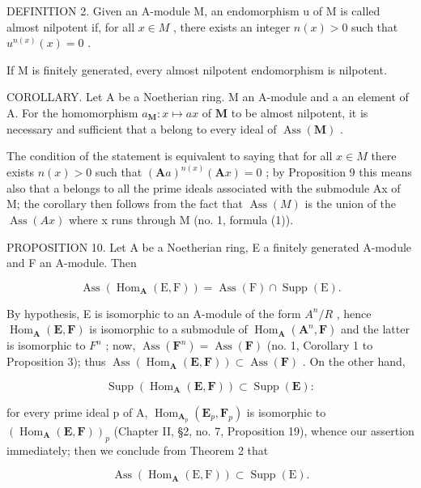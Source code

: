 DEFINITION 2. Given an A-module M, an endomorphism u of M is called almost nilpotent if, for all \(x \in M\) , there exists an integer \(n(x) > 0\) such that \(u^{n(x)}(x) = 0\) .

If M is finitely generated, every almost nilpotent endomorphism is nilpotent.

COROLLARY. Let A be a Noetherian ring. M an A-module and a an element of A. For the homomorphism \(a_{\mathbf{M}}: x \mapsto ax\) of \(\mathbf{M}\) to be almost nilpotent, it is necessary and sufficient that a belong to every ideal of \(\operatorname{Ass}(\mathbf{M})\) .

The condition of the statement is equivalent to saying that for all \(x \in M\) there exists \(n(x) > 0\) such that \((\mathbf{A}a)^{n(x)}(\mathbf{A}x) = 0\) ; by Proposition 9 this means also that a belongs to all the prime ideals associated with the submodule Ax of M; the corollary then follows from the fact that \(\operatorname{Ass}(M)\) is the union of the \(\operatorname{Ass}(Ax)\) where x runs through M (no. 1, formula (1)).

PROPOSITION 10. Let A be a Noetherian ring, E a finitely generated A-module and F an A-module. Then

\[
\operatorname{Ass} \left(\operatorname{Hom} _ {\mathbf {A}} (\mathrm{E}, \mathrm{F})\right) = \operatorname{Ass} (\mathrm{F}) \cap \operatorname{Supp} (\mathrm{E}).\tag{5}
\]

By hypothesis, E is isomorphic to an A-module of the form \(A^{n}/R\) , hence \(\operatorname{Hom}_{\mathbf{A}}(\mathbf{E}, \mathbf{F})\) is isomorphic to a submodule of \(\operatorname{Hom}_{\mathbf{A}}(\mathbf{A}^{n}, \mathbf{F})\) and the latter is isomorphic to \(F^{n}\) ; now, \(\operatorname{Ass}(\mathbf{F}^{n}) = \operatorname{Ass}(\mathbf{F})\) (no. 1, Corollary 1 to Proposition 3); thus \(\operatorname{Ass}(\operatorname{Hom}_{\mathbf{A}}(\mathbf{E}, \mathbf{F})) \subset \operatorname{Ass}(\mathbf{F})\) . On the other hand,

\[
\operatorname{Supp} (\operatorname{Hom} _ {\mathbf {A}} (\mathbf {E}, \mathbf {F})) \subset \operatorname{Supp} (\mathbf {E}):
\]

for every prime ideal p of A, \(\operatorname{Hom}_{\mathbf{A}_{p}}(\mathbf{E}_{p}, \mathbf{F}_{p})\) is isomorphic to \((\operatorname{Hom}_{\mathbf{A}}(\mathbf{E}, \mathbf{F}))_{p}\) (Chapter II, §2, no. 7, Proposition 19), whence our assertion immediately; then we conclude from Theorem 2 that

\[
\operatorname{Ass} \left(\operatorname{Hom} _ {\mathbf {A}} (\mathrm{E}, \mathrm{F})\right) \subset \operatorname{Supp} (\mathrm{E}).
\]

